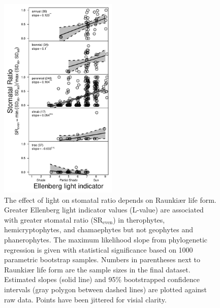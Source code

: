 \documentclass[12pt, oneside]{article}
\newcommand{\el}{L-value}
\begin{document}
\begin{figure}[ht]
\centerline{\includegraphics[width=0.5\textwidth]{figures/figure_SRmultReg.pdf}}
\caption{The effect of light on stomatal ratio depends on Raunki\ae r life form. Greater Ellenberg light indicator values (\el) are associated with greater stomatal ratio ($\mathrm{SR_{even}}$) in therophytes, hemicryptophytes, and chamaephytes but not geophytes and phanerophytes. The maximum likelihood slope from phylogenetic regression is given with statistical significance based on 1000 parametric bootstrap samples. Numbers in parentheses next to Raunki\ae r life form are the sample sizes in the final dataset. Estimated slopes (solid line) and 95\% bootstrapped confidence intervals (gray polygon between dashed lines) are plotted against raw data. Points have been jittered for visial clarity.} 
\label{fig:SRmultReg}
\end{figure}
\end{document}

